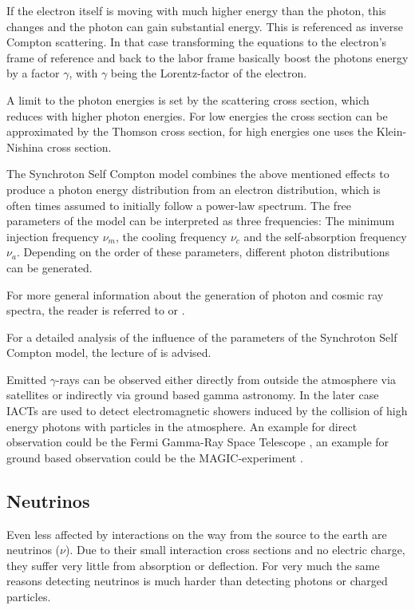 If the electron itself is moving with much higher energy
than the photon, this changes and the photon can gain substantial energy.
This is referenced as inverse Compton scattering.
In that case transforming the equations to the 
electron's frame of reference and back to the labor frame 
basically boost the photons energy by a factor $\gamma$, 
with $\gamma$ being the Lorentz-factor of the electron.

A limit to the photon energies is set by the scattering cross
section, which reduces with higher photon energies.
For low energies the cross section can be approximated by 
the Thomson cross section, for high energies
one uses the Klein-Nishina cross section.

The Synchroton Self Compton model combines the above mentioned
effects to produce a photon energy distribution from an
electron distribution, which is often times assumed to
initially follow a power-law spectrum.
The free parameters of the model can be interpreted as 
three frequencies: The minimum injection frequency $\nu_m$, 
the cooling frequency $\nu_c$ and the self-absorption frequency $\nu_a$.
Depending on the order of these parameters, different 
photon distributions can be generated.

For more general information about the generation of photon 
and cosmic ray spectra, the reader is referred to 
\cite{gaisser_engel_resconi_2016}
or
\cite{bookap}.

For a detailed analysis of the influence of the parameters of
the Synchroton Self Compton model, 
the lecture of \cite{10.1093/mnras/stt1461} is advised.


Emitted $\gamma$-rays can be observed either directly
from outside the atmosphere via satellites or indirectly
via ground based gamma astronomy. In the later case
IACTs are used to detect electromagnetic showers induced
by the collision of high energy photons with particles in the atmosphere.
An example for direct observation could be the Fermi 
Gamma-Ray Space Telescope \cite{Atwood_2009},
an example for ground based observation could be the
MAGIC-experiment \cite{LORENZ2004339}.

\iffalse
\subsection{Neutrinos}
Even less affected by interactions on the way 
from the source to the earth are neutrinos ($\nu$).
Due to their small interaction cross sections and no electric charge, they 
suffer very little from absorption or deflection.
For very much the same reasons detecting neutrinos is much harder
than detecting photons or charged particles.


